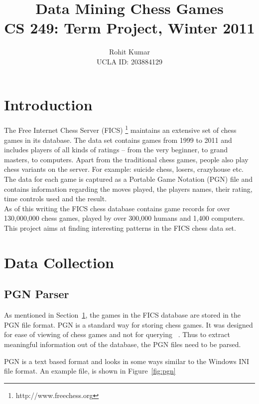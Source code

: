 \documentclass{article}
\author{Rohit Kumar \\UCLA ID: 203884129}
\title{Data Mining Chess Games \\ CS 249: Term Project, Winter 2011}
\begin{document}
\maketitle


\section{Introduction}
\label{sec:intro}
The Free Internet Chess Server (FICS) \footnote{http://www.freechess.org} maintains an extensive set of chess games in its database. The data set contains games from 1999 to 2011 and includes players of all kinds of ratings -- from the very beginner, to grand masters, to computers. Apart from the traditional chess games, people also play chess variants on the server. For example: suicide chess, losers, crazyhouse etc. The data for each game is captured as a Portable Game Notation (PGN) \cite{wiki:pgn} file and contains information regarding the moves played, the players names, their rating, time controls used and the result. \\

As of this writing the FICS chess database contains game records for over 130,000,000 chess games, played by over 300,000 humans and 1,400 computers. This project aims at finding interesting patterns in the FICS chess data set.

\section{Data Collection}

\subsection{PGN Parser}

As mentioned in Section~\ref{sec:intro}, the games in the FICS
database are stored in the PGN file format. PGN is a standard way for
storing chess games. It was designed for ease of viewing of chess
games and not for querying ~\cite{spec:pgn}. Thus to extract meaningful information out of the database, the PGN files need to be parsed.

PGN is a text based format and looks in some ways similar to the Windows INI file format. An example file, is shown in Figure~\ref{fig:pgn}
\end{document}
